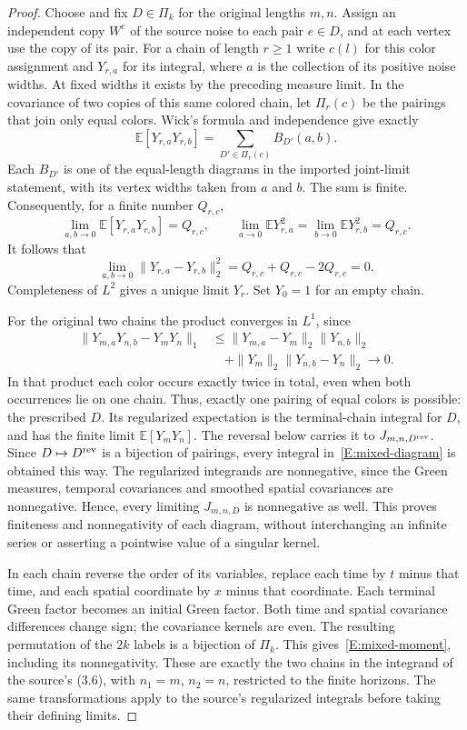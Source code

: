 \documentclass[12pt]{article}
\numberwithin{equation}{section}
\theoremstyle{definition}
\newcommand{\E}{\mathbb{E}}
\begin{document}
\begin{proof}
  Choose and fix $D\in\Pi_k$ for the original lengths $m,n$.
  Assign an independent copy $W^e$ of the source noise to each pair
  $e\in D$, and at each vertex use the copy of its pair. For a chain
  of length $r\ge1$ write $c(l)$ for this color assignment and
  $Y_{r,a}$ for its integral, where $a$ is the collection of its positive
  noise widths. At fixed widths it exists by the preceding measure limit.
  In the covariance of two copies of this same colored chain, let
  $\Pi_r(c)$ be the pairings that join only equal colors. Wick's formula
  and independence give exactly
  \[
    \E[Y_{r,a}Y_{r,b}]
    =\sum_{D'\in\Pi_r(c)}B_{D'}(a,b).
  \]
  Each $B_{D'}$ is one of the equal-length diagrams in the imported
  joint-limit statement, with its vertex widths taken from $a$ and $b$.
  The sum is finite. Consequently, for a finite number $Q_{r,c}$,
  \[
    \lim_{a,b\to0}\E[Y_{r,a}Y_{r,b}]=Q_{r,c},\qquad
    \lim_{a\to0}\E Y_{r,a}^2=\lim_{b\to0}\E Y_{r,b}^2=Q_{r,c}.
  \]
  It follows that
  \[
    \lim_{a,b\to0}\|Y_{r,a}-Y_{r,b}\|_2^2
    =Q_{r,c}+Q_{r,c}-2Q_{r,c}=0.
  \]
  Completeness of $L^2$ gives a unique limit $Y_r$. Set $Y_0=1$
  for an empty chain.

  For the original two chains the product converges in $L^1$, since
  \[
    \begin{split}
      \|Y_{m,a}Y_{n,b}-Y_mY_n\|_1
      &\le\|Y_{m,a}-Y_m\|_2\|Y_{n,b}\|_2\\
      &\quad+\|Y_m\|_2\|Y_{n,b}-Y_n\|_2\longrightarrow0.
    \end{split}
  \]
  In that product each color occurs exactly twice in total, even when
  both occurrences lie on one chain. Thus, exactly one pairing of equal
  colors is possible: the prescribed $D$. Its regularized expectation
  is the terminal-chain integral for $D$, and has the finite limit
  $\E[Y_mY_n]$. The reversal below carries it to $J_{m,n,D^{\rm rev}}$.
  Since $D\mapsto D^{\rm rev}$ is a bijection of pairings, every
  integral in~\eqref{E:mixed-diagram} is obtained this way.
  The regularized integrands are nonnegative, since the Green measures,
  temporal covariances and smoothed spatial covariances are nonnegative.
  Hence, every limiting $J_{m,n,D}$ is nonnegative as well. This proves
  finiteness and nonnegativity of each diagram, without interchanging
  an infinite series or asserting a pointwise value of a singular kernel.

  In each chain reverse the order of its variables, replace each time by
  $t$ minus that time, and each spatial coordinate by $x$ minus that
  coordinate. Each terminal Green factor becomes an initial Green factor.
  Both time and spatial covariance differences change sign; the covariance
  kernels are even. The resulting permutation of the $2k$ labels is a
  bijection of $\Pi_k$. This gives~\eqref{E:mixed-moment}, including its
  nonnegativity. These are exactly the two chains in the integrand of
  the source's (3.6), with $n_1=m$, $n_2=n$, restricted to the finite
  horizons. The same transformations apply to the source's regularized
  integrals before taking their defining limits.


\end{proof}
\end{document}
